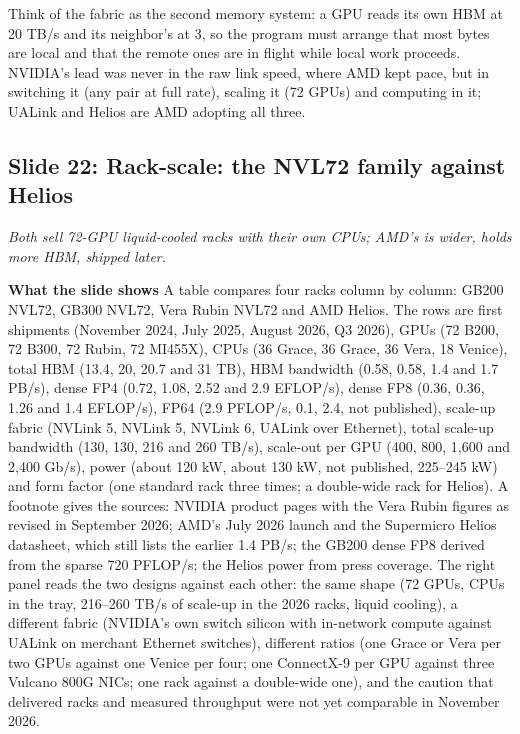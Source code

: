 \documentclass[11pt,letterpaper]{article}
\newcommand{\slide}[3]{%
  \subsection[Slide #1: #2]{Slide #1: #2}%
  {\color{muted}\itshape #3\par}\medskip}
\newcommand{\para}[1]{\medskip\noindent\textbf{#1}\quad}
\newenvironment{intuition}{\begin{tcolorbox}[intuitionbox]}{\end{tcolorbox}}
\begin{document}
\begin{intuition}
Think of the fabric as the second memory system: a GPU reads its own HBM at 20 TB/s and its neighbor's at 3, so the program must arrange that most bytes are local and that the remote ones are in flight while local work proceeds. NVIDIA's lead was never in the raw link speed, where AMD kept pace, but in switching it (any pair at full rate), scaling it (72 GPUs) and computing in it; UALink and Helios are AMD adopting all three.
\end{intuition}

\slide{22}{Rack-scale: the NVL72 family against Helios}{Both sell 72-GPU liquid-cooled racks with their own CPUs; AMD's is wider, holds more HBM, shipped later.}

\para{What the slide shows} A table compares four racks column by column: GB200 NVL72, GB300 NVL72, Vera Rubin NVL72 and AMD Helios. The rows are first shipments (November 2024, July 2025, August 2026, Q3 2026), GPUs (72 B200, 72 B300, 72 Rubin, 72 MI455X), CPUs (36 Grace, 36 Grace, 36 Vera, 18 Venice), total HBM (13.4, 20, 20.7 and 31 TB), HBM bandwidth (0.58, 0.58, 1.4 and 1.7 PB/s), dense FP4 (0.72, 1.08, 2.52 and 2.9 EFLOP/s), dense FP8 (0.36, 0.36, 1.26 and 1.4 EFLOP/s), FP64 (2.9 PFLOP/s, 0.1, 2.4, not published), scale-up fabric (NVLink 5, NVLink 5, NVLink 6, UALink over Ethernet), total scale-up bandwidth (130, 130, 216 and 260 TB/s), scale-out per GPU (400, 800, 1{,}600 and 2{,}400 Gb/s), power (about 120 kW, about 130 kW, not published, 225--245 kW) and form factor (one standard rack three times; a double-wide rack for Helios). A footnote gives the sources: NVIDIA product pages with the Vera Rubin figures as revised in September 2026; AMD's July 2026 launch and the Supermicro Helios datasheet, which still lists the earlier 1.4 PB/s; the GB200 dense FP8 derived from the sparse 720 PFLOP/s; the Helios power from press coverage. The right panel reads the two designs against each other: the same shape (72 GPUs, CPUs in the tray, 216--260 TB/s of scale-up in the 2026 racks, liquid cooling), a different fabric (NVIDIA's own switch silicon with in-network compute against UALink on merchant Ethernet switches), different ratios (one Grace or Vera per two GPUs against one Venice per four; one ConnectX-9 per GPU against three Vulcano 800G NICs; one rack against a double-wide one), and the caution that delivered racks and measured throughput were not yet comparable in November 2026.
\end{document}
